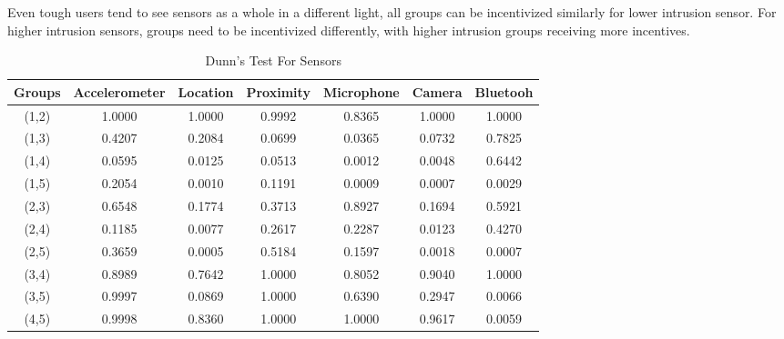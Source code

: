 Even tough users tend to see sensors as a whole in a different light, all groups can be incentivized similarly for lower intrusion sensor. For higher intrusion sensors, groups need to be incentivized differently, with higher intrusion groups receiving more incentives.

\begin{table}[h!]
  \centering
  \caption{Dunn's Test For Sensors}
  \label{tab:dunn_sensors}
  \begin{tabular}{ccccccc}
    \toprule
     Groups & Accelerometer & Location & Proximity & Microphone & Camera & Bluetooh \\
    \midrule
    (1,2) & 1.0000 & 1.0000 & 0.9992 & 0.8365 & 1.0000 & 1.0000 \\
    (1,3) & 0.4207 & 0.2084 & 0.0699 & 0.0365 & 0.0732 & 0.7825 \\
    (1,4) & 0.0595 & 0.0125 & 0.0513 & 0.0012 & 0.0048 & 0.6442 \\
    (1,5) & 0.2054 & 0.0010 & 0.1191 & 0.0009 & 0.0007 & 0.0029 \\
    (2,3) & 0.6548 & 0.1774 & 0.3713 & 0.8927 & 0.1694 & 0.5921 \\
    (2,4) & 0.1185 & 0.0077 & 0.2617 & 0.2287 & 0.0123 & 0.4270 \\
    (2,5) & 0.3659 & 0.0005 & 0.5184 & 0.1597 & 0.0018 & 0.0007 \\
    (3,4) & 0.8989 & 0.7642 & 1.0000 & 0.8052 & 0.9040 & 1.0000 \\
    (3,5) & 0.9997 & 0.0869 & 1.0000 & 0.6390 & 0.2947 & 0.0066 \\
    (4,5) & 0.9998 & 0.8360 & 1.0000 & 1.0000 & 0.9617 & 0.0059 \\
    \bottomrule
  \end{tabular}
\end{table} 

